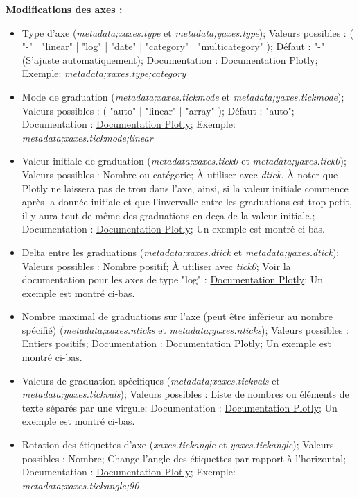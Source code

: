 \documentclass[11pt]{article}
\begin{document}
\textbf{Modifications des axes :}
\begin{itemize}
    \item Type d'axe (\textit{metadata;xaxes.type} et \textit{metadata;yaxes.type}); Valeurs possibles : ( "-" | "linear" | "log" | "date" | "category" | "multicategory" ); Défaut : "-" (S'ajuste automatiquement); Documentation : \href{https://plotly.com/python/reference/layout/xaxis/#layout-xaxis-type}{Documentation Plotly}; Exemple: \textit{metadata;xaxes.type;category}
    \item Mode de graduation (\textit{metadata;xaxes.tickmode} et \textit{metadata;yaxes.tickmode}); Valeurs possibles : ( "auto" | "linear" | "array" ); Défaut : "auto"; Documentation : \href{https://plotly.com/python/reference/layout/xaxis/#layout-xaxis-minor-tickmode}{Documentation Plotly}; Exemple: \textit{metadata;xaxes.tickmode;linear}
    \item Valeur initiale de graduation (\textit{metadata;xaxes.tick0} et \textit{metadata;yaxes.tick0}); Valeurs possibles : Nombre ou catégorie; À utiliser avec \textit{dtick}. À noter que Plotly ne laissera pas de trou dans l'axe, ainsi, si la valeur initiale commence après la donnée initiale et que l'invervalle entre les graduations est trop petit, il y aura tout de même des graduations en-deça de la valeur initiale.; Documentation : \href{https://plotly.com/python/reference/layout/xaxis/#layout-xaxis-tick0}{Documentation Plotly}; Un exemple est montré ci-bas.
    \item Delta entre les graduations (\textit{metadata;xaxes.dtick} et \textit{metadata;yaxes.dtick}); Valeurs possibles : Nombre positif; À utiliser avec \textit{tick0}; Voir la documentation pour les axes de type "log" : \href{https://plotly.com/python/reference/layout/xaxis/#layout-xaxis-dtick}{Documentation Plotly}; Un exemple est montré ci-bas.
    \item Nombre maximal de graduations sur l'axe (peut être inférieur au nombre spécifié) (\textit{metadata;xaxes.nticks} et \textit{metadata;yaxes.nticks}); Valeurs possibles : Entiers positifs; Documentation : \href{https://plotly.com/python/reference/layout/xaxis/#layout-xaxis-minor-nticks}{Documentation Plotly}; Un exemple est montré ci-bas.
    \item Valeurs de graduation spécifiques (\textit{metadata;xaxes.tickvals} et \textit{metadata;yaxes.tickvals}); Valeurs possibles : Liste de nombres ou éléments de texte séparés par une virgule; Documentation : \href{https://plotly.com/python/reference/layout/xaxis/#layout-xaxis-minor-tickvals}{Documentation Plotly}; Un exemple est montré ci-bas.
    \item Rotation des étiquettes d'axe (\textit{xaxes.tickangle} et \textit{yaxes.tickangle}); Valeurs possibles : Nombre; Change l'angle des étiquettes par rapport à l'horizontal; Documentation : \href{https://plotly.com/python/reference/layout/xaxis/#layout-xaxis-tickangle}{Documentation Plotly}; Exemple: \textit{metadata;xaxes.tickangle;90}
\end{itemize}
\end{document}
